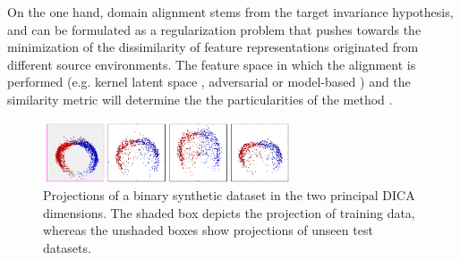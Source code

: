 On the one hand, domain alignment stems from the target invariance hypothesis, 
and can be formulated as a regularization problem that pushes towards the 
minimization of the dissimilarity of feature  representations originated 
from different source environments. The feature space in which the 
alignment is performed (e.g. kernel latent space 
\cite{muandetDomainGeneralizationInvariant2013}, 
adversarial
\cite{peiMultiAdversarialDomainAdaptation}
or model-based
\cite{arjovskyInvariantRiskMinimization2020}) 
and the similarity metric will
determine the the particularities of the method
\cite{shenWassersteinDistanceGuided2018,liangComprehensiveSurveyTestTime2023}. \\

\begin{figure}[H]
    \centering
    \includegraphics[width=0.65\textwidth]{img/introduction/dica.png}
    \caption{
    Projections of a binary synthetic dataset in the two principal DICA
    dimensions. The shaded box depicts the projection of training 
    data, whereas the unshaded boxes show projections of unseen 
    test datasets. \cite{muandetDomainGeneralizationInvariant2013}
    }
    \label{fig:dica}
\end{figure}

